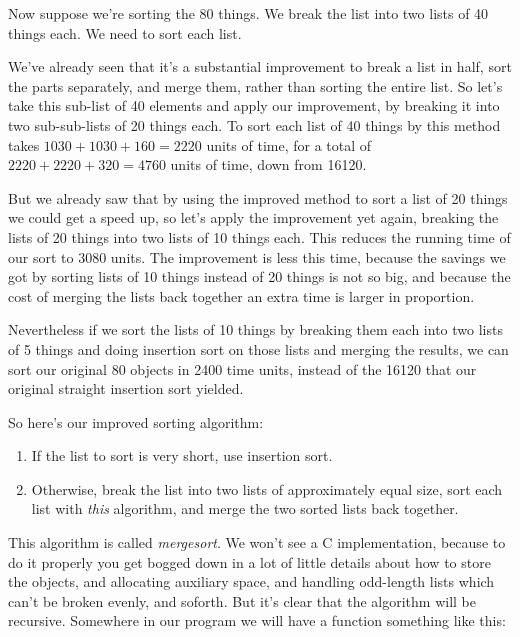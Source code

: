 Now suppose we're sorting the 80 things.  We break the list into two
lists of 40 things each.  We need to sort each list.

We've already seen that it's a substantial improvement to break a list
in half, sort the parts separately, and merge them, rather than sorting
the entire list.  So let's take this sub-list of 40 elements and apply
our improvement, by breaking it into two sub-sub-lists of 20 things
each.  To sort each list of 40 things by this method takes
$1030+1030+160 = 2220$ units of time, for a total of $2220+2220+320 =
4760$ units of time, down from 16120.  

But we already saw that by using the improved method to sort a list of
20 things we could get a speed up, so let's apply the improvement yet
again, breaking the lists of 20 things into two lists of 10 things each.
This reduces the running time of our sort to 3080 units.  The
improvement is less this time, because the savings we got by sorting
lists of 10 things instead of 20 things is not so big, and because the
cost of merging the lists back together an extra time is larger in
proportion.  

Nevertheless if we sort the lists of 10 things by breaking them each
into two lists of 5 things and doing insertion sort on those lists and
merging the results, we can sort our original 80 objects in 2400 time
units, instead of the 16120 that our original straight insertion sort
yielded. 

So here's our improved sorting algorithm:

\begin{enumerate}
\item If the list to sort is very short, use insertion sort.
\item Otherwise, break the list into two lists of approximately equal
size, sort each list with {\em this}\/ algorithm, and merge the two
sorted lists back together.
\end{enumerate}

This algorithm is called {\em mergesort}\/.  We won't see a C
implementation, because to do it properly you get bogged down in a lot of
little details about how to store the objects, and allocating auxiliary
space, and handling odd-length lists which can't be broken evenly, and
soforth.  But it's clear that the algorithm will be recursive.
Somewhere in our program we will have a function something like this:

